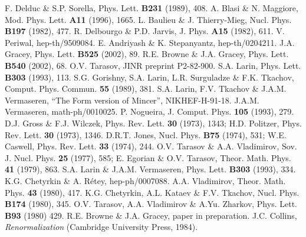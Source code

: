 \documentclass[a4paper,11pt]{article}
\begin{document}
\begin{thebibliography}{99}
 F. Delduc \& S.P. Sorella, Phys. Lett. {\bf B231} (1989), 408. 
 A. Blasi \& N. Maggiore, Mod. Phys. Lett. {\bf A11} (1996), 1665. 
 L. Baulieu \& J. Thierry-Mieg, Nucl. Phys. {\bf B197} (1982), 477.
 R. Delbourgo \& P.D. Jarvis, J. Phys. {\bf A15} (1982), 611.
 V. Periwal, hep-th/9509084. 
 E. Andriyash \& K. Stepanyantz, hep-th/0204211. 
 J.A. Gracey, Phys. Lett. {\bf B525} (2002), 89. 
 R.E. Browne \& J.A. Gracey, Phys. Lett. {\bf B540} (2002), 68. 
 O.V. Tarasov, JINR preprint P2-82-900. 
 S.A. Larin, Phys. Lett. {\bf B303} (1993), 113.
 S.G. Gorishny, S.A. Larin, L.R. Surguladze \& F.K. Tkachov,
Comput. Phys. Commun. {\bf 55} (1989), 381. 
 S.A. Larin, F.V. Tkachov \& J.A.M. Vermaseren, ``The Form version
of Mincer'', NIKHEF-H-91-18. 
 J.A.M. Vermaseren, math-ph/0010025. 
 P. Nogueira, J. Comput. Phys. {\bf 105} (1993), 279. 
 D.J. Gross \& F.J. Wilczek, Phys. Rev. Lett. {\bf 30}
(1973), 1343; 
H.D. Politzer, Phys. Rev. Lett. {\bf 30} (1973), 1346.
 D.R.T. Jones, Nucl. Phys. {\bf B75} (1974), 531; 
W.E. Caswell, Phys. Rev. Lett. {\bf 33} (1974), 244. 
 O.V. Tarasov \& A.A. Vladimirov, Sov. J. Nucl. Phys. {\bf 25} 
(1977), 585;  
E. Egorian \& O.V. Tarasov, Theor. Math. Phys. {\bf 41} (1979), 863. 
 S.A. Larin \& J.A.M. Vermaseren, Phys. Lett. {\bf B303} (1993), 
334. 
 K.G. Chetyrkin \& A. R\'{e}tey, hep-ph/0007088.  
 A.A. Vladimirov, Theor. Math. Phys. {\bf 43} (1980), 417.
 K.G. Chetyrkin, A.L. Kataev \& F.V. Tkachov, Nucl. Phys. {\bf 
B174} (1980), 345.
 O.V. Tarasov, A.A. Vladimirov \& A.Yu. Zharkov, Phys. Lett. 
{\bf B93} (1980) 429.
 R.E. Browne \& J.A. Gracey, paper in preparation. 
 J.C. Collins, {\it Renormalization} (Cambridge University Press,
1984). 
\end{thebibliography}
\end{document}

